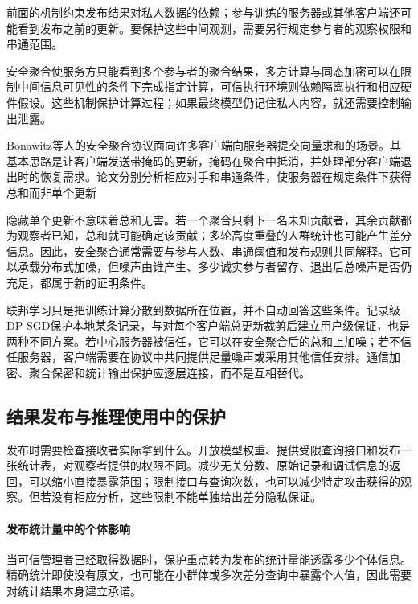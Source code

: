 前面的机制约束发布结果对私人数据的依赖；参与训练的服务器或其他客户端还可能看到发布之前的更新。要保护这些中间观测，需要另行规定参与者的观察权限和串通范围。

安全聚合使服务方只能看到多个参与者的聚合结果，多方计算与同态加密可以在限制中间信息可见性的条件下完成指定计算，可信执行环境则依赖隔离执行和相应硬件假设。这些机制保护计算过程；如果最终模型仍记住私人内容，就还需要控制输出泄露。

Bonawitz等人的安全聚合协议面向许多客户端向服务器提交向量求和的场景。其基本思路是让客户端发送带掩码的更新，掩码在聚合中抵消，并处理部分客户端退出时的恢复需求。论文分别分析相应对手和串通条件，使服务器在规定条件下获得总和而非单个更新

隐藏单个更新不意味着总和无害。若一个聚合只剩下一名未知贡献者，其余贡献都为观察者已知，总和就可能确定该贡献；多轮高度重叠的人群统计也可能产生差分信息。因此，安全聚合通常需要与参与人数、串通阈值和发布规则共同解释。它可以承载分布式加噪，但噪声由谁产生、多少诚实参与者留存、退出后总噪声是否仍充足，都属于新的证明条件。

联邦学习只是把训练计算分散到数据所在位置，并不自动回答这些条件。记录级DP-SGD保护本地某条记录，与对每个客户端总更新裁剪后建立用户级保证，也是两种不同方案。若中心服务器被信任，它可以在安全聚合后的总和上加噪；若不信任服务器，客户端需要在协议中共同提供足量噪声或采用其他信任安排。通信加密、聚合保密和统计输出保护应逐层连接，而不是互相替代。

\subsection{结果发布与推理使用中的保护}
\label{sec:privacy-statistical-release}
\label{sec:privacy-inference-context}
\label{sec:privacy-repeated-use}

发布时需要检查接收者实际拿到什么。开放模型权重、提供受限查询接口和发布一张统计表，对观察者提供的权限不同。减少无关分数、原始记录和调试信息的返回，可以缩小直接暴露范围；限制接口与查询次数，也可以减少特定攻击获得的观察。但若没有相应分析，这些限制不能单独给出差分隐私保证。

\paragraph{发布统计量中的个体影响}

当可信管理者已经取得数据时，保护重点转为发布的统计量能透露多少个体信息。精确统计即使没有原文，也可能在小群体或多次差分查询中暴露个人值，因此需要对统计结果本身建立承诺。

